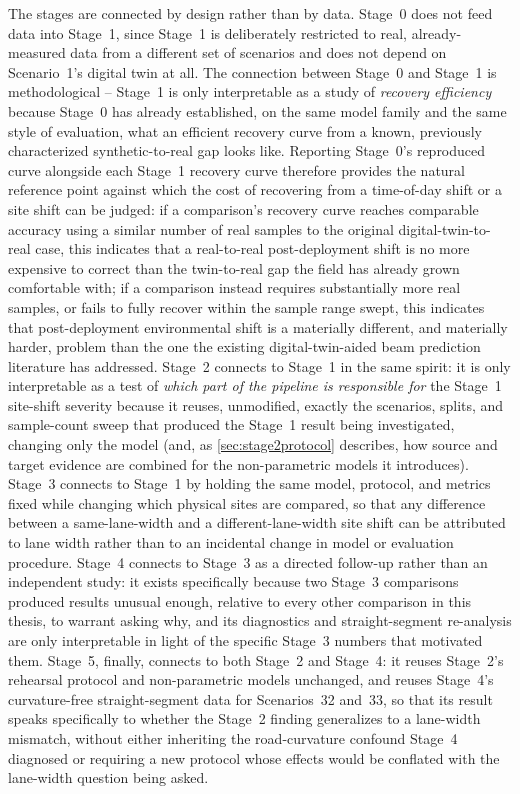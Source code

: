 \documentclass{iutbscthesis}
\begin{document}
The stages are connected by design rather than by data. Stage~0 does not feed data into Stage~1, since Stage~1 is deliberately restricted to real, already-measured data from a different set of scenarios and does not depend on Scenario~1's digital twin at all. The connection between Stage~0 and Stage~1 is methodological -- Stage~1 is only interpretable as a study of \emph{recovery efficiency} because Stage~0 has already established, on the same model family and the same style of evaluation, what an efficient recovery curve from a known, previously characterized synthetic-to-real gap looks like. Reporting Stage~0's reproduced curve alongside each Stage~1 recovery curve therefore provides the natural reference point against which the cost of recovering from a time-of-day shift or a site shift can be judged: if a comparison's recovery curve reaches comparable accuracy using a similar number of real samples to the original digital-twin-to-real case, this indicates that a real-to-real post-deployment shift is no more expensive to correct than the twin-to-real gap the field has already grown comfortable with; if a comparison instead requires substantially more real samples, or fails to fully recover within the sample range swept, this indicates that post-deployment environmental shift is a materially different, and materially harder, problem than the one the existing digital-twin-aided beam prediction literature has addressed. Stage~2 connects to Stage~1 in the same spirit: it is only interpretable as a test of \emph{which part of the pipeline is responsible for} the Stage~1 site-shift severity because it reuses, unmodified, exactly the scenarios, splits, and sample-count sweep that produced the Stage~1 result being investigated, changing only the model (and, as \autoref{sec:stage2protocol} describes, how source and target evidence are combined for the non-parametric models it introduces). Stage~3 connects to Stage~1 by holding the same model, protocol, and metrics fixed while changing which physical sites are compared, so that any difference between a same-lane-width and a different-lane-width site shift can be attributed to lane width rather than to an incidental change in model or evaluation procedure. Stage~4 connects to Stage~3 as a directed follow-up rather than an independent study: it exists specifically because two Stage~3 comparisons produced results unusual enough, relative to every other comparison in this thesis, to warrant asking why, and its diagnostics and straight-segment re-analysis are only interpretable in light of the specific Stage~3 numbers that motivated them. Stage~5, finally, connects to both Stage~2 and Stage~4: it reuses Stage~2's rehearsal protocol and non-parametric models unchanged, and reuses Stage~4's curvature-free straight-segment data for Scenarios~32 and~33, so that its result speaks specifically to whether the Stage~2 finding generalizes to a lane-width mismatch, without either inheriting the road-curvature confound Stage~4 diagnosed or requiring a new protocol whose effects would be conflated with the lane-width question being asked.
\end{document}
